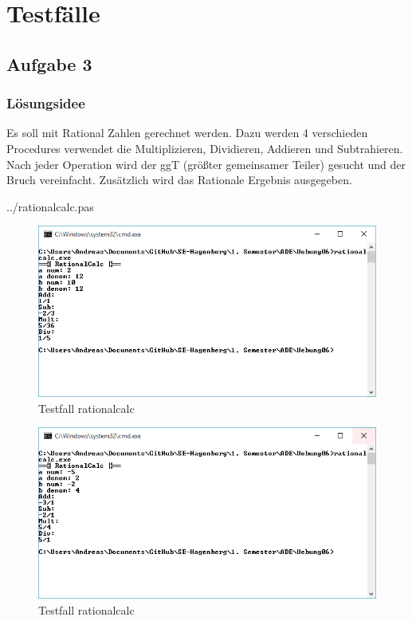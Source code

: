 \section*{Testfälle}


\newpage

\subsection*{Aufgabe 3}
\subsubsection*{Lösungsidee}
Es soll mit Rational Zahlen gerechnet werden. Dazu werden 4 verschieden Procedures verwendet die Multiplizieren, Dividieren, Addieren und Subtrahieren. Nach jeder Operation wird der ggT (größter gemeinsamer Teiler) gesucht und der Bruch vereinfacht. Zusätzlich wird das Rationale Ergebnis ausgegeben.
\newline

 {../rationalcalc.pas}
\begin{figure}[H]
	\centering
	\includegraphics[scale=0.85]{./pictures/rationalcalc1.png}
	\caption{Testfall rationalcalc}
	\label{fig: rationalcalc1}
\end{figure}

\begin{figure}[H]
	\centering
	\includegraphics[scale=0.85]{./pictures/rationalcalc3.png}
	\caption{Testfall rationalcalc}
	\label{fig: rationalcalc3}
\end{figure}

